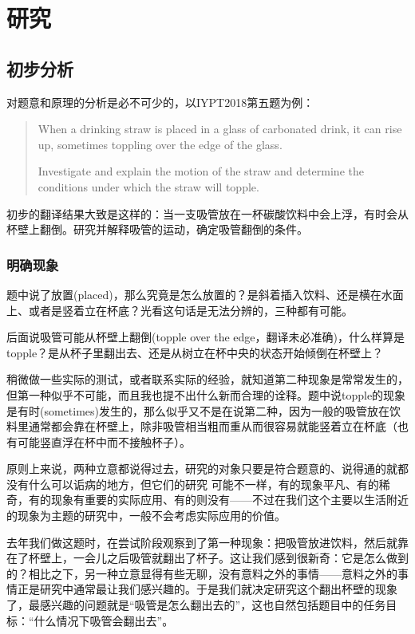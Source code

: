 \documentclass[a4paper,10pt,english]{sphinxmanual}
\begin{document}
\chapter{研究}
\label{\detokenize{5. Research:id1}}\label{\detokenize{5. Research::doc}}

\section{初步分析}
\label{\detokenize{5. Research:id2}}
对题意和原理的分析是必不可少的，以IYPT2018第五题为例：
\begin{quote}

When a drinking straw is placed in a glass of carbonated drink, it can rise up, sometimes toppling over the edge of the glass.

Investigate and explain the motion of the straw and determine the conditions under which the straw will topple.
\end{quote}

初步的翻译结果大致是这样的：当一支吸管放在一杯碳酸饮料中会上浮，有时会从杯壁上翻倒。研究并解释吸管的运动，确定吸管翻倒的条件。


\subsection{明确现象}
\label{\detokenize{5. Research:id3}}
题中说了放置(placed)，那么究竟是怎么放置的？是斜着插入饮料、还是横在水面上、或者是竖着立在杯底？光看这句话是无法分辨的，三种都有可能。

后面说吸管可能从杯壁上翻倒(topple over the edge，翻译未必准确)，什么样算是topple？是从杯子里翻出去、还是从树立在杯中央的状态开始倾倒在杯壁上？

稍微做一些实际的测试，或者联系实际的经验，就知道第二种现象是常常发生的，但第一种似乎不可能，而且我也提不出什么新而合理的诠释。题中说topple的现象是有时(sometimes)发生的，那么似乎又不是在说第二种，因为一般的吸管放在饮料里通常都会靠在杯壁上，除非吸管相当粗而重从而很容易就能竖着立在杯底（也有可能竖直浮在杯中而不接触杯子）。

原则上来说，两种立意都说得过去，研究的对象只要是符合题意的、说得通的就都没有什么可以诟病的地方，但它们的研究  可能不一样，有的现象平凡、有的稀奇，有的现象有重要的实际应用、有的则没有——不过在我们这个主要以生活附近的现象为主题的研究中，一般不会考虑实际应用的价值。

去年我们做这题时，在尝试阶段观察到了第一种现象：把吸管放进饮料，然后就靠在了杯壁上，一会儿之后吸管就翻出了杯子。这让我们感到很新奇：它是怎么做到的？相比之下，另一种立意显得有些无聊，没有意料之外的事情——意料之外的事情正是研究中通常最让我们感兴趣的。于是我们就决定研究这个翻出杯壁的现象了，最感兴趣的问题就是“吸管是怎么翻出去的”，这也自然包括题目中的任务目标：“什么情况下吸管会翻出去”。
\end{document}
